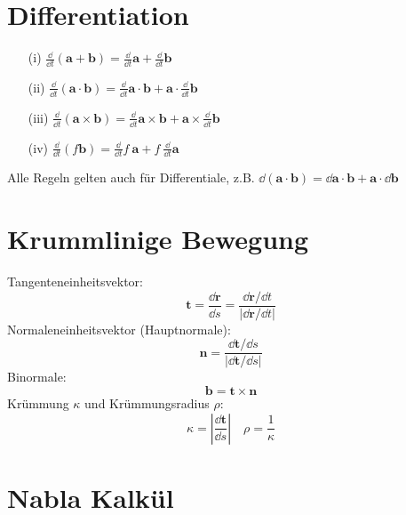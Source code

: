 
\section{Differentiation}

\begin{framedprop}
	\begin{enumerate}
		\item[(i)] $\frac{\dd}{\dd t} (\mathbf{a} + \mathbf{b}) = \frac{\dd}{\dd t} \mathbf{a} + \frac{\dd}{\dd t} \mathbf{b}$
		
		\item[(ii)] $\frac{\dd}{\dd t} (\mathbf{a} \cdot \mathbf{b}) = \frac{\dd}{\dd t} \mathbf{a} \cdot \mathbf{b} + \mathbf{a} \cdot \frac{\dd}{\dd t} \mathbf{b}$
		
		\item[(iii)] $\frac{\dd}{\dd t} (\mathbf{a} \times \mathbf{b}) = \frac{\dd}{\dd t} \mathbf{a} \times \mathbf{b} + \mathbf{a} \times \frac{\dd}{\dd t} \mathbf{b}$
		
		\item[(iv)] $\frac{\dd}{\dd t} (f \mathbf{b}) = \frac{\dd}{\dd t} f \  \mathbf{a} + f \  \frac{\dd}{\dd t} \mathbf{a}$
	\end{enumerate}

Alle Regeln gelten auch für Differentiale, z.B. $\dd (\mathbf{a} \cdot \mathbf{b}) = \dd \mathbf{a} \cdot \mathbf{b} + \mathbf{a} \cdot \dd \mathbf{b}$
\end{framedprop}

\section{Krummlinige Bewegung}

\begin{framedprop}
Tangenteneinheitsvektor:
\[
\mathbf{t} = \frac{\dd \mathbf{r}}{\dd s} = \frac{\dd \mathbf{r}/ \dd t}{|\dd \mathbf{r} / \dd t|}
\]
Normaleneinheitsvektor (Hauptnormale):
\[
\mathbf{n} = \frac{\dd \mathbf{t} / \dd s}{|\dd \mathbf{t} / \dd s|}
\]
Binormale:
\[
\mathbf{b} = \mathbf{t} \times \mathbf{n}
\]
Krümmung $\kappa$ und Krümmungsradius $\rho$:
\[
\kappa = \left|\frac{\dd \mathbf{t}}{\dd s}\right| \quad \rho = \frac{1}{\kappa}
\]

\end{framedprop}

\section{Nabla Kalkül}


